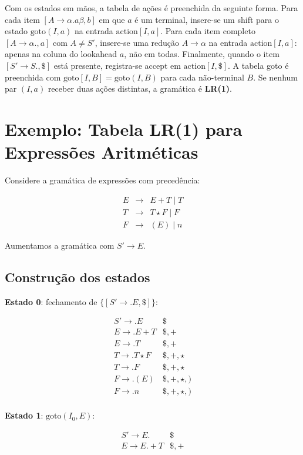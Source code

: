 Com os estados em mãos, a tabela de ações é preenchida da seguinte
forma. Para cada item \([A \to \alpha . a \beta, b]\) em que \(a\) é
um terminal, insere-se um shift para o estado \(\text{goto}(I, a)\)
na entrada \(\text{action}[I, a]\). Para cada item completo \([A \to
\alpha ., a]\) com \(A \neq S'\), insere-se uma redução \(A \to
\alpha\) na entrada \(\text{action}[I, a]\): apenas na coluna do
lookahead \(a\), não em todas. Finalmente, quando o item \([S' \to S
., \$]\) está presente, registra-se accept em \(\text{action}[I,
\$]\). A tabela goto é preenchida com \(\text{goto}[I, B] =
\text{goto}(I, B)\) para cada não-terminal \(B\). Se nenhum par \((I,
a)\) receber duas ações distintas, a gramática é \textbf{LR(1)}.

\section{Exemplo: Tabela LR(1) para Expressões Aritméticas}

Considere a gramática de expressões com precedência:

\[
\begin{array}{lcl}
  E & \to & E + T \mid T \\
  T & \to & T \star F \mid F \\
  F & \to & ( E ) \mid n
\end{array}
\]

Aumentamos a gramática com \(S' \to E\).

\subsection{Construção dos estados}

\textbf{Estado 0}: fechamento de \(\{[S' \to . E, \$]\}\):

\[
\begin{array}{ll}
  S' \to . E    & \$ \\
  E \to . E + T & \$,+ \\
  E \to . T     & \$,+ \\
  T \to . T \star F & \$,+,\star \\
  T \to . F     & \$,+,\star \\
F \to . ( E ) & \$,+,\star,) \\
F \to . n     & \$,+,\star,)\\
\end{array}
\]

\textbf{Estado 1}: \(\text{goto}(I_0, E)\):

\[
\begin{array}{ll}
S' \to E . & \$ \\
E \to E . + T & \$,+
\end{array}
\]

